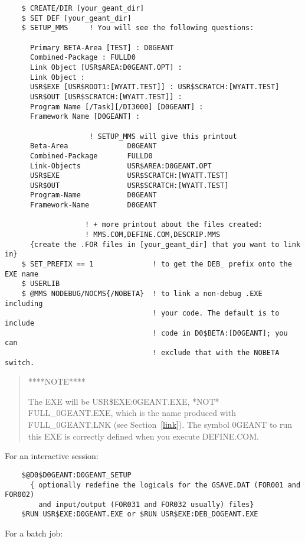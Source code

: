 \begin{verbatim}
    $ CREATE/DIR [your_geant_dir]
    $ SET DEF [your_geant_dir]
    $ SETUP_MMS     ! You will see the following questions:

      Primary BETA-Area [TEST] : D0GEANT
      Combined-Package : FULLD0
      Link Object [USR$AREA:D0GEANT.OPT] :
      Link Object :
      USR$EXE [USR$ROOT1:[WYATT.TEST]] : USR$SCRATCH:[WYATT.TEST]
      USR$OUT [USR$SCRATCH:[WYATT.TEST]] :
      Program Name [/Task][/DI3000] [D0GEANT] :
      Framework Name [D0GEANT] :

                    ! SETUP_MMS will give this printout
      Beta-Area              D0GEANT
      Combined-Package       FULLD0
      Link-Objects           USR$AREA:D0GEANT.OPT
      USR$EXE                USR$SCRATCH:[WYATT.TEST]
      USR$OUT                USR$SCRATCH:[WYATT.TEST]
      Program-Name           D0GEANT
      Framework-Name         D0GEANT

                   ! + more printout about the files created:
                   ! MMS.COM,DEFINE.COM,DESCRIP.MMS
      {create the .FOR files in [your_geant_dir] that you want to link in}
    $ SET_PREFIX == 1              ! to get the DEB_ prefix onto the EXE name
    $ USERLIB
    $ @MMS NODEBUG/NOCMS{/NOBETA}  ! to link a non-debug .EXE including
                                   ! your code. The default is to include
                                   ! code in D0$BETA:[D0GEANT]; you can
                                   ! exclude that with the NOBETA switch.

\end{verbatim}

\begin{quote}
\centerline{****NOTE****}
The EXE will be USR\$EXE:\D0GEANT.EXE, *NOT* FULL\_\D0GEANT.EXE, which is the
name produced with FULL\_\D0GEANT.LNK (see Section~\ref{link}). The symbol
\D0GEANT to run this EXE is correctly defined when you execute DEFINE.COM.
\end{quote}

For an interactive session:

\begin{verbatim}
    $@D0$D0GEANT:D0GEANT_SETUP
      { optionally redefine the logicals for the GSAVE.DAT (FOR001 and FOR002)
        and input/output (FOR031 and FOR032 usually) files}
    $RUN USR$EXE:D0GEANT.EXE or $RUN USR$EXE:DEB_D0GEANT.EXE
\end{verbatim}

For a batch job:

